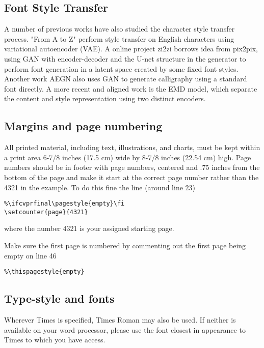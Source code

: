 \documentclass[10pt,twocolumn,letterpaper]{article}
\begin{document}
\subsection{Font Style Transfer}
A number of previous works have also studied the character style transfer process. "From A to Z" perform style transfer on English characters using variational autoencoder (VAE). A online project zi2zi borrows idea from pix2pix, using GAN with encoder-decoder and the U-net structure in the generator to perform font generation in a latent space created by some fixed font styles. Another work AEGN also uses GAN to generate calligraphy using a standard font directly. A more recent and aligned work is the EMD model, which separate the content and style representation using two distinct encoders. 

\subsection{Margins and page numbering}

All printed material, including text, illustrations, and charts, must be kept
within a print area 6-7/8 inches (17.5 cm) wide by 8-7/8 inches (22.54 cm)
high.
Page numbers should be in footer with page numbers, centered and .75
inches from the bottom of the page and make it start at the correct page
number rather than the 4321 in the example.  To do this fine the line (around
line 23)
\begin{verbatim}
%\ifcvprfinal\pagestyle{empty}\fi
\setcounter{page}{4321}
\end{verbatim}
where the number 4321 is your assigned starting page.

Make sure the first page is numbered by commenting out the first page being
empty on line 46
\begin{verbatim}
%\thispagestyle{empty}
\end{verbatim}


\subsection{Type-style and fonts}

Wherever Times is specified, Times Roman may also be used. If neither is
available on your word processor, please use the font closest in
appearance to Times to which you have access.
\end{document}

